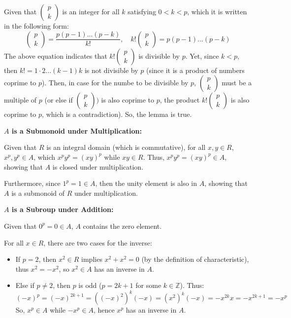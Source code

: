 \documentclass{article}
\begin{document}
Given that $\begin{pmatrix}
    p\\k
\end{pmatrix}$ is an integer for all $k$ satisfying $0<k<p$, which it is written in the following form:
$$\begin{pmatrix}
    p\\k
\end{pmatrix}=\frac{p(p-1)...(p-k)}{k!},\quad k!\begin{pmatrix}
    p\\k
\end{pmatrix}=p(p-1)...(p-k)$$
The above equation indicates that $k!\begin{pmatrix}
    p\\k
\end{pmatrix}$ is divisible by $p$. Yet, since $k<p$, then $k!=1\cdot 2...(k-1)k$ is not divisible by $p$ (since it is a product of numbers coprime to $p$).
Then, in case for the numbe to be divisible by $p$, $\begin{pmatrix}
    p\\k
\end{pmatrix}$ must be a multiple of $p$ (or else if $\begin{pmatrix}
    p\\k
\end{pmatrix})$ is also coprime to $p$, the product $k!\begin{pmatrix}
    p\\k
\end{pmatrix}$ is also coprime to $p$, which is a contradiction). So, the lemma is true.

\hfill

\hfill

\textbf{$A$ is a Submonoid under Multiplication:}

Given that $R$ is an integral domain (which is commutative), for all $x,y\in R$, $x^p,y^p\in A$, which $x^py^p = (xy)^p$ while $xy\in R$.
Thus, $x^py^p = (xy)^p\in A$, showing that $A$ is closed under multiplication.

Furthermore, since $1^p=1\in A$, then the unity element is also in $A$, showing that $A$ is a submonoid of $R$ under multiplication.

\hfill

\textbf{$A$ is a Subroup under Addition:}

Given that $0^p = 0 \in A$, $A$ contains the zero element.

For all $x\in R$, there are two cases for the inverse:
\begin{itemize}
    \item If $p=2$, then $x^2\in R$ implies $x^2+x^2=0$ (by the definition of characteristic), thus $x^2=-x^2$, so $x^2\in A$ has an inverse in $A$.
    \item Else if $p\neq 2$, then $p$ is odd ($p=2k+1$ for some $k\in\mathbb{Z}$). Thus:
    $$(-x)^p = (-x)^{2k+1} = ((-x)^2)^k(-x) = (x^2)^k(-x) = -x^{2k}x = -x^{2k+1}=-x^p$$
    So, $x^p\in A$ while $-x^p\in A$, hence $x^p$ has an inverse in $A$.
\end{itemize}
\end{document}
